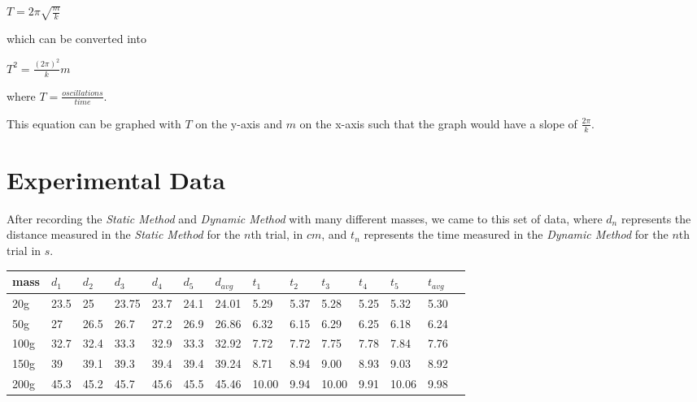 \documentclass{article}
\begin{document}
\begin{center}$T=2\pi\sqrt{\frac{m}{k}}$\end{center}

	which can be converted into
	
\begin{center}$T^{2}=\frac{(2\pi)^{2}}{k}m$\end{center}

where $T=\frac{oscillations}{time}$.

This equation can be graphed with $T$ on the y-axis and $m$ on the x-axis such that the graph would have a slope of $\frac{2\pi}{k}$.

\section{Experimental Data}
After recording the \emph{Static Method} and \emph{Dynamic Method} with
	many different masses, we came to this set of data, where $d_{n}$ represents the distance measured in the \emph{Static Method} for the $n$th trial, in $cm$, and $t_{n}$ represents the time measured in the \emph{Dynamic Method} for the $n$th trial in $s$.

\begin{center}
\begin{table}[h]
\begin{tabular}{|l|l|l|l|l|l|l|l|l|l|l|l|l|l|}
\hline
mass & $d_1$ & $d_2$ & $d_3$ & $d_4$ & $d_5$ & $d_{avg}$ & $t_1$ & $t_2$ & $t_3$ & $t_4$ & $t_5$ & $t_{avg}$ \\ \hline 
20g & 23.5 & 25 & 23.75 & 23.7 & 24.1 & 24.01 & 5.29 & 5.37 & 5.28 & 5.25 & 5.32 & 5.30 \\ \hline
50g & 27 & 26.5 & 26.7 & 27.2 & 26.9 & 26.86 & 6.32 & 6.15 & 6.29 & 6.25 & 6.18 & 6.24 \\ \hline
100g & 32.7 & 32.4 & 33.3 & 32.9 & 33.3 & 32.92 & 7.72 & 7.72 & 7.75 & 7.78 & 7.84 & 7.76 \\ \hline
150g & 39 & 39.1 & 39.3 & 39.4 & 39.4 & 39.24 & 8.71 & 8.94 & 9.00 & 8.93 & 9.03 & 8.92 \\ \hline
200g & 45.3 & 45.2 & 45.7 & 45.6 & 45.5 & 45.46 & 10.00 & 9.94 & 10.00 & 9.91 & 10.06 & 9.98 \\ \hline

\end{tabular}
\end{table}
\end{center}

 \datatable
\end{document}
